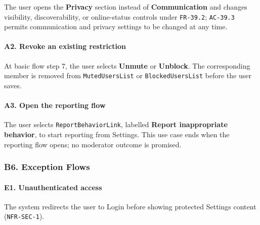 \documentclass[12pt]{article}
\begin{document}
The user opens the \textbf{Privacy} section instead of \textbf{Communication} and changes visibility, discoverability, or online-status controls under \texttt{FR-39.2}; \texttt{AC-39.3} permits communication and privacy settings to be changed at any time.
\par\medskip

\hypertarget{sec:a2-revoke-an-existing-restriction}{}
\paragraph*{A2. Revoke an existing restriction}
\par\medskip

At basic flow step 7, the user selects \textbf{Unmute} or \textbf{Unblock}. The corresponding member is removed from \texttt{MutedUsersList} or \texttt{BlockedUsersList} before the user saves.
\par\medskip

\hypertarget{sec:a3-open-the-reporting-flow}{}
\paragraph*{A3. Open the reporting flow}
\par\medskip

The user selects \texttt{ReportBehaviorLink}, labelled \textbf{Report inappropriate behavior}, to start reporting from Settings. This use case ends when the reporting flow opens; no moderator outcome is promised.
\par\medskip

\hypertarget{sec:b6-exception-flows}{}
\subsubsection*{B6. Exception Flows}
\par\medskip

\hypertarget{sec:e1-unauthenticated-access}{}
\paragraph*{E1. Unauthenticated access}
\par\medskip

The system redirects the user to Login before showing protected Settings content (\texttt{NFR-SEC-1}).
\par\medskip

\hypertarget{sec:e2-unsupported-selection}{}
\end{document}
